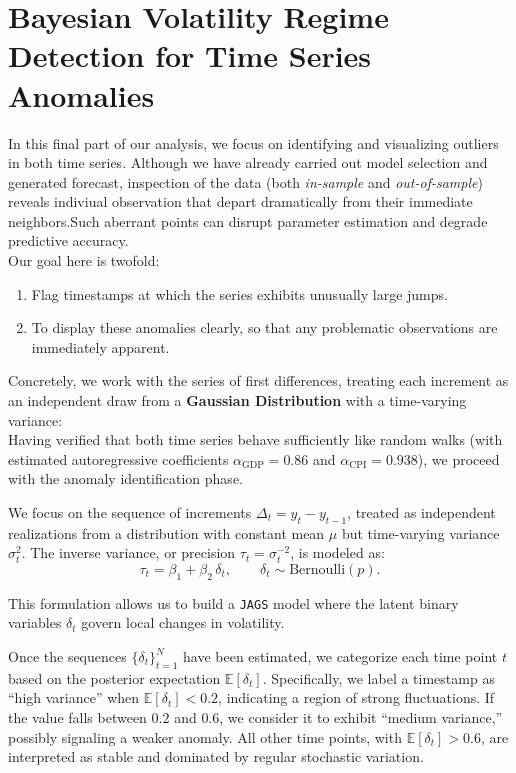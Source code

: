 \documentclass{Configuration_Files/PoliMi3i_thesis}
\begin{document}
\chapter{Bayesian Volatility Regime Detection for Time Series Anomalies}
In this final part of our analysis, we focus on identifying and visualizing outliers in both time series. Although we have already carried out model selection and generated forecast, inspection of the data (both \textit{in-sample} and \textit{out-of-sample}) reveals indiviual observation that depart dramatically from their immediate neighbors.Such aberrant points can disrupt parameter estimation and degrade predictive accuracy.\\
Our goal here is twofold:
\begin{enumerate}
    \item Flag timestamps at which the series exhibits unusually large jumps.
    \item To display these anomalies clearly, so that any problematic observations are immediately apparent.
\end{enumerate}
Concretely, we work with the series of first differences, treating each increment as an independent draw from a \textbf{Gaussian Distribution} with a time-varying variance:\\
Having verified that both time series behave sufficiently like random walks (with estimated autoregressive coefficients \(\alpha_{\text{GDP}} = 0.86\) and \(\alpha_{\text{CPI}} = 0.938\)), we proceed with the anomaly identification phase.

We focus on the sequence of increments \(\Delta_t = y_t - y_{t-1}\), treated as independent realizations from a distribution with constant mean \(\mu\) but time-varying variance \(\sigma_t^2\). The inverse variance, or precision \(\tau_t = \sigma_t^{-2}\), is modeled as:
\[
\tau_t = \beta_1 + \beta_2\, \delta_t, \qquad \delta_t \sim \text{Bernoulli}(p).
\]

This formulation allows us to build a \texttt{JAGS} model where the latent binary variables \(\delta_t\) govern local changes in volatility.

Once the sequences \(\{\delta_t\}_{t=1}^N\) have been estimated, we categorize each time point \(t\) based on the posterior expectation \(\mathbb{E}[\delta_t]\). Specifically, we label a timestamp as ``high variance'' when \(\mathbb{E}[\delta_t] < 0.2\), indicating a region of strong fluctuations. If the value falls between \(0.2\) and \(0.6\), we consider it to exhibit ``medium variance,'' possibly signaling a weaker anomaly. All other time points, with \(\mathbb{E}[\delta_t] > 0.6\), are interpreted as stable and dominated by regular stochastic variation.\\
\end{document}
